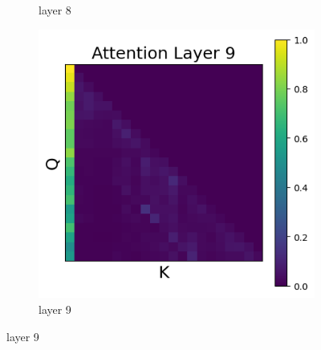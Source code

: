 \documentclass[11pt]{article}
\begin{document}
\begin{figure}[t]
\begin{subfigure}[t]{0.24\textwidth}
    \caption{layer 8}
  \end{subfigure}\hfill
      \begin{subfigure}[t]{0.24\textwidth}
    \centering
    \includegraphics[width=1.4\columnwidth]{figures/no_intervention/layer_9.png}
    \caption{layer 9}
  \end{subfigure}\hfill
    

\end{figure}
\end{document}
